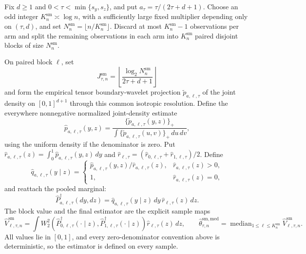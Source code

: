Fix \(d\ge1\) and \(0<\tau<\min\{s_y,s_z\}\), and put \(a_\tau=\tau/(2\tau+d+1)\). Choose an odd integer \(K_n^{\mathrm{sm}}\asymp\log n\), with a sufficiently large fixed multiplier depending only on \((\tau,d)\), and set \(N_n^{\mathrm{sm}}=\lfloor n/K_n^{\mathrm{sm}}\rfloor\). Discard at most \(K_n^{\mathrm{sm}}-1\) observations per arm and split the remaining observations in each arm into \(K_n^{\mathrm{sm}}\) paired disjoint blocks of size \(N_n^{\mathrm{sm}}\).

On paired block \(\ell\), set
\[
J_{\tau,n}^{\mathrm{sm}}=
\left\lfloor\frac{\log_2 N_n^{\mathrm{sm}}}{2\tau+d+1}\right\rfloor
\]
and form the empirical tensor boundary-wavelet projection \(\widetilde p_{a,\ell,\tau}\) of the joint density on \([0,1]^{d+1}\) through this common isotropic resolution. Define the everywhere nonnegative normalized joint-density estimate
\[
\widehat p_{a,\ell,\tau}(y,z)=
\frac{\{\widetilde p_{a,\ell,\tau}(y,z)\}_+}
{\int\{\widetilde p_{a,\ell,\tau}(u,v)\}_+\,du\,dv},
\]
using the uniform density if the denominator is zero. Put \(\widehat r_{a,\ell,\tau}(z)=\int_0^1\widehat p_{a,\ell,\tau}(y,z)\,dy\) and \(\widehat r_{\ell,\tau}=(\widehat r_{0,\ell,\tau}+\widehat r_{1,\ell,\tau})/2\). Define
\[
\widehat q_{a,\ell,\tau}(y\mid z)=
\begin{cases}
\widehat p_{a,\ell,\tau}(y,z)/\widehat r_{a,\ell,\tau}(z),&\widehat r_{a,\ell,\tau}(z)>0,\\
1,&\widehat r_{a,\ell,\tau}(z)=0,
\end{cases}
\]
and reattach the pooled marginal:
\[
\widehat P_{a,\ell,\tau}^{\dagger}(dy,dz)
=\widehat q_{a,\ell,\tau}(y\mid z)\,dy\,\widehat r_{\ell,\tau}(z)\,dz.
\]
The block value and the final estimator are the explicit sample maps
\[
\widehat V_{\ell,\tau,n}^{\mathrm{sm}}
=\int W_2^2\!\left(\widehat P_{0,\ell,\tau}^{\dagger}(\cdot\mid z),
\widehat P_{1,\ell,\tau}^{\dagger}(\cdot\mid z)\right)
\widehat r_{\ell,\tau}(z)\,dz,
\qquad
\widehat\theta^{\mathrm{sm,med}}_{\tau,n}
=\operatorname{median}_{1\le\ell\le K_n^{\mathrm{sm}}}
\widehat V_{\ell,\tau,n}^{\mathrm{sm}}.
\]
All values lie in \([0,1]\), and every zero-denominator convention above is deterministic, so the estimator is defined on every sample.